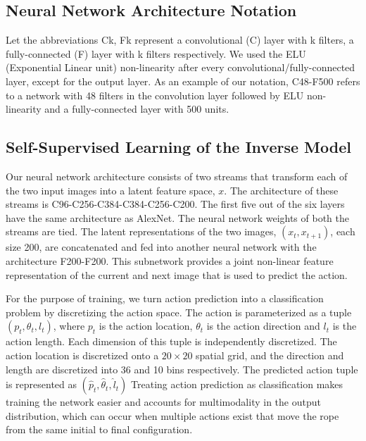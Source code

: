 \documentclass[letterpaper, 10 pt, conference]{ieeeconf}  %
\begin{document}
\subsection{Neural Network Architecture Notation} 

Let the abbreviations Ck, Fk represent a convolutional (C) layer with k filters, a fully-connected (F) layer with k filters respectively. We used the ELU (Exponential Linear unit) non-linearity after every convolutional/fully-connected layer, except for the output layer. As an example of our notation, C48-F500 refers to a network with 48 filters in the convolution layer followed by ELU non-linearity and a fully-connected layer with 500 units.

\subsection{Self-Supervised Learning of the Inverse Model}

\label{sec:inverse}
Our neural network architecture consists of two streams that transform each of the two input images into a latent feature space, $x$. The architecture of these  streams is C96-C256-C384-C384-C256-C200. The first five out of the six layers have the same architecture as AlexNet. The neural network weights of both the streams are tied. The latent representations of the two images, $(x_t, x_{t+1})$, each size 200, are concatenated and fed into another neural network with the architecture F200-F200. This subnetwork provides a joint non-linear feature representation of the current and next image that is used to predict the action.

For the purpose of training, we turn action prediction into a classification problem by discretizing the action space. The action is parameterized as a tuple $(p_t, \theta_t, l_t)$, where $p_t$ is the action location, $\theta_t$ is the action direction and $l_t$ is the action length. Each dimension of this tuple is independently discretized. The action location is discretized onto a $20\times20$ spatial grid, and the direction and length are discretized into 36 and 10 bins respectively. The predicted action tuple is represented as $(\hat{p}_t, \hat{\theta}_t, \hat{l}_t)$ Treating action prediction as classification makes training the network easier and accounts for multimodality in the output distribution, which can occur when multiple actions exist that move the rope from the same initial to final configuration.
\end{document}
